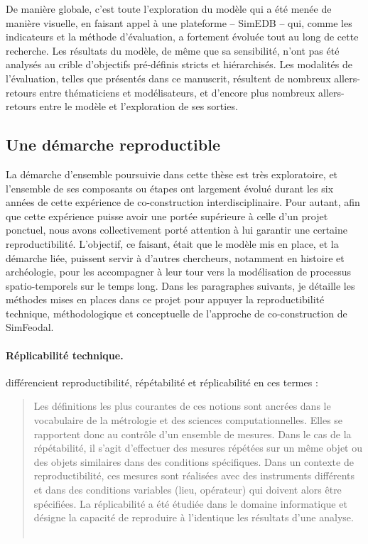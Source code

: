 De manière globale, c'est toute l'exploration du modèle qui a été menée de manière visuelle, en faisant appel à une plateforme -- SimEDB -- qui, comme les indicateurs et la méthode d'évaluation, a fortement évoluée tout au long de cette recherche.
Les \og résultats\fg{} du modèle, de même que sa sensibilité, n'ont pas été analysés au crible d'objectifs pré-définis stricts et hiérarchisés.
Les modalités de l'évaluation, telles que présentés dans ce manuscrit, résultent de nombreux allers-retours entre thématiciens et modélisateurs, et d'encore plus nombreux allers-retours entre le modèle et l'exploration de ses sorties.


\subsection{Une démarche reproductible}

La démarche d'ensemble poursuivie dans cette thèse est très exploratoire, et l'ensemble de ses composants ou étapes ont largement évolué durant les six années de cette expérience de co-construction interdisciplinaire.
Pour autant, afin que cette expérience puisse avoir une portée supérieure à celle d'un projet ponctuel, nous avons collectivement porté attention à lui garantir une certaine reproductibilité.
L'objectif, ce faisant, était que le modèle mis en place, et la démarche liée, puissent servir à d'autres chercheurs, notamment en histoire et archéologie, pour les accompagner à leur tour vers la modélisation de processus spatio-temporels sur le temps long.
Dans les paragraphes suivants, je détaille les méthodes mises en places dans ce projet pour appuyer la reproductibilité technique, méthodologique et conceptuelle de l'approche de co-construction de SimFeodal.

\paragraph{Réplicabilité technique.}

\textcite{reycoyrehourcq:hal-01677950} différencient reproductibilité, répétabilité et réplicabilité en ces termes :
\begin{quotation}
	\noindent \og
	Les définitions les plus courantes de ces notions sont ancrées dans le vocabulaire de la métrologie et des sciences computationnelles.
	Elles se rapportent donc au contrôle d'un ensemble de mesures.
	Dans le cas de la répétabilité, il s'agit d'effectuer des mesures répétées sur un même objet ou des objets similaires dans des conditions spécifiques.
	Dans un contexte de reproductibilité, ces mesures sont réalisées avec des instruments différents et dans des conditions variables (lieu, opérateur) qui doivent alors être spécifiées.
	La réplicabilité a été étudiée dans le domaine informatique et désigne la capacité de reproduire à l'identique les résultats d'une analyse.
	\fg{}\\
	\mbox{}~ \hfill \cite[411]{reycoyrehourcq:hal-01677950}
\end{quotation}

